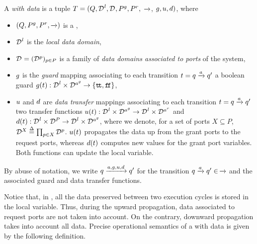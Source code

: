 \begin{definition}
  \label{defn:data}
  A \emph{\compmodel{} with data} is a tuple $T=(Q, \local{\data}, \data,
  \pin, \pout,$ \mbox{$\goesto{}$,} $\guard, \up, \down)$, where
  \begin{itemize}
  \item $(Q, \pin, \pout, \goesto{})$ is a \compmodel{},
  \item $\local{\data}$ is the \emph{local data domain},
  \item $\data = (\data[p])_{p \in P}$ is a family of \emph{data domains
    associated to ports} of the system,
  \item $\guard$ is the \emph{guard} mapping associating to each transition
    $t = q \goesto{a} q'$ a boolean guard $\guard(t): \local{\data} \times
    \data[\grant{a}] \rightarrow \{\true,\false\}$,
  \item $\up$ and $\down$ are \emph{data transfer} mappings associating to
    each transition $t = q \goesto{a} q'$ two transfer functions $\up(t):
    \local{\data} \times \data[\grant{a}] \rightarrow \local{\data} \times
    \data[\request{a}]$ and $\down(t): \local{\data} \times \data[P]
    \rightarrow \local{\data} \times \data[\grant{a}]$, where we denote,
    for a set of ports $X \subseteq P$, $\data[X] \bydef{=} \prod_{p \in X}
    \data[p]$.  $\up(t)$ propagates the data up from the grant ports to the
    request ports, whereas $\down(t)$ computes new values for the grant
    port variables.  Both functions can update the local variable.
  \end{itemize}

  By abuse of notation, we write $q \goesto{a,\guard,\up,\down} q'$ for
  the transition $q \goesto{a} q' \in\, \goesto{}$ and the associated guard
  and data transfer functions.
\end{definition}

Notice that, in , all the data preserved between two execution
cycles is stored in the local variable.  Thus, during the upward
propagation, data associated to request ports are not taken into account.
On the contrary, downward propagation takes into account all data.  Precise
operational semantics of a \compmodel{} with data is given by the following
definition.

